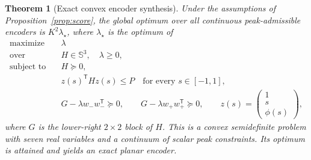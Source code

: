 \documentclass[11pt,letterpaper]{article}
\newtheorem{theorem}{Theorem}
\theoremstyle{remark}
\newcommand{\T}{\mathsf T}
\newcommand{\suc}{\succeq}
\begin{document}
\begin{theorem}[Exact convex encoder synthesis]
\label{thm:sdp}
Under the assumptions of Proposition~\ref{prop:score}, the global optimum over all continuous peak-admissible encoders is $K^2\lambda_\star$, where $\lambda_\star$ is the optimum of
\begin{equation}
\begin{aligned}
 \text{maximize}\quad &\lambda\\
 \text{over}\quad &H\in\mathbb S^3,\quad\lambda\ge0,\\
 \text{subject to}\quad
 &H\suc0,\\
 &z(s)^\T H z(s)\le P\quad\text{for every }s\in[-1,1],\\
 &G-\lambda w_-w_-^\T\suc0,\qquad
 G-\lambda w_+w_+^\T\suc0,
 \qquad z(s)=\begin{pmatrix}1\\s\\\phi(s)\end{pmatrix},
\end{aligned}
\label{eq:sdp}
\end{equation}
where $G$ is the lower-right $2\times2$ block of $H$. This is a convex semidefinite problem with seven real variables and a continuum of scalar peak constraints. Its optimum is attained and yields an exact planar encoder.
\end{theorem}
\end{document}
